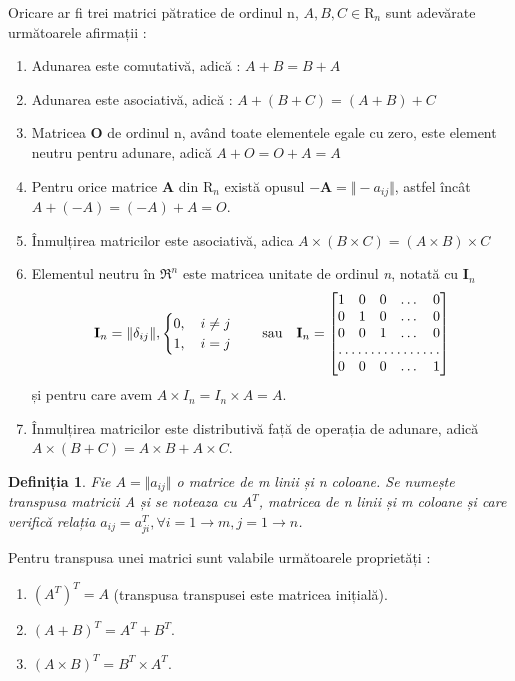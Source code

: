 Oricare ar fi trei matrici pătratice de ordinul n, $A, B, C \in \mathrm{R}_{n}$
sunt adevărate următoarele afirmații :
\begin{enumerate}
  \item Adunarea este comutativă, adică : $A + B = B + A$
  \item Adunarea este asociativă, adică : $A + (B + C) = (A + B) + C$
  \item Matricea \textbf{O} de ordinul n, având toate elementele egale cu zero,
  este element neutru pentru adunare, adică $A + O = O + A = A$
  \item Pentru orice matrice \textbf{A} din $\mathrm{R}_n$ există opusul
  $\mathbf{-A} = \Vert -a_{ij} \Vert$, astfel încât $A + (-A) = (-A) + A = O$.
  \item Înmulțirea matricilor este asociativă, adica $A \times (B \times C) =
  (A \times B) \times C$
  \item Elementul neutru în $\mathfrak{R}^n$ este matricea unitate de ordinul
  \textit{n}, notată cu $\mathbf{I}_{n}$
  \[
  \mathbf{I}_{n} = \Vert \delta_{ij} \Vert,
  \begin{cases}
  0, \quad i \neq j \\
  1, \quad i = j
  \end{cases} \quad \text{sau} \quad
  \mathbf{I}_{n} = 
  \begin{bmatrix}
  1 & 0 & 0 & \dots & 0 \\
  0 & 1 & 0 & \dots & 0 \\
  0 & 0 & 1 & \dots & 0 \\
  \hdotsfor{5} \\
  0 & 0 & 0 & \dots & 1
  \end{bmatrix}
  \] și pentru care avem $A \times I_{n} = I_{n} \times A = A$.
  \item Înmulțirea matricilor este distributivă față de operația de adunare,
  adică $A \times (B + C) = A \times B + A \times C$.
\end{enumerate}

\newtheorem{th_transpose}[th_matrixdef]{Definiția}
\begin{th_transpose}
Fie $A = \Vert a_{ij} \Vert$ o matrice de \textit{m} linii și
\textit{n} coloane. Se numește transpusa matricii A și se noteaza cu $A^T$,
matricea de \textit{n} linii și \textit{m} coloane și care verifică relația
$a_{ij} = a^T_{ji}, \forall i = 1 \to m, j = 1 \to n$.
\end{th_transpose}
Pentru transpusa unei matrici sunt valabile următoarele proprietăți :
\begin{enumerate}
  \item $(A^T)^T = A$ (transpusa transpusei este matricea inițială).
  \item $(A + B)^T = A^T + B^T$.
  \item $(A \times B) ^ T = B ^ T \times A ^ T$.
\end{enumerate}

